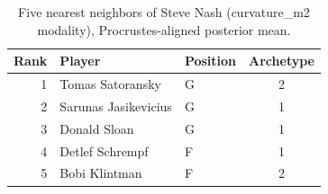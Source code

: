 \begin{table}[htbp]
  \centering\small
  \begin{tabular}{rllc}
    \toprule
    Rank & Player & Position & Archetype \\
    \midrule
    1 & Tomas Satoransky & G & 2 \\
    2 & Sarunas Jasikevicius & G & 1 \\
    3 & Donald Sloan & G & 1 \\
    4 & Detlef Schrempf & F & 1 \\
    5 & Bobi Klintman & F & 2 \\
    \bottomrule
  \end{tabular}
  \caption{Five nearest neighbors of Steve Nash (curvature_m2 modality), Procrustes-aligned posterior mean.}
  \label{tab:Steve_Nash_neighbors_curvature_m2}
\end{table}

